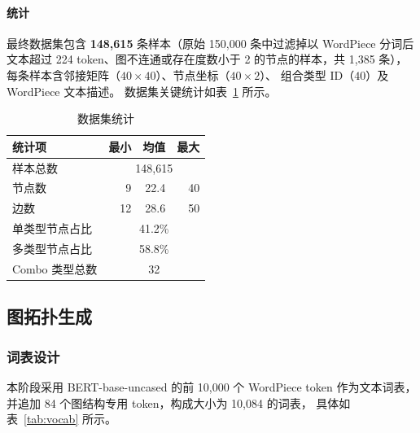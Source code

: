 \paragraph{统计}
最终数据集包含 \textbf{148,615} 条样本（原始 150,000 条中过滤掉以 WordPiece 分词后文本超过 224 token、图不连通或存在度数小于 2 的节点的样本，共 1,385 条），
每条样本含邻接矩阵（$40{\times}40$）、节点坐标（$40{\times}2$）、
组合类型 ID（$40$）及 WordPiece 文本描述。
数据集关键统计如表~\ref{tab:dataset_stats} 所示。

\begin{table}[h]
\centering
\caption{数据集统计}
\label{tab:dataset_stats}
\small
\begin{tabular}{lrrr}
\toprule
统计项 & 最小 & 均值 & 最大 \\
\midrule
样本总数           & \multicolumn{3}{c}{148,615} \\
节点数             & 9    & 22.4 & 40  \\
边数               & 12   & 28.6 & 50  \\
单类型节点占比     & \multicolumn{3}{c}{41.2\%} \\
多类型节点占比     & \multicolumn{3}{c}{58.8\%} \\
Combo 类型总数     & \multicolumn{3}{c}{32} \\
\bottomrule
\end{tabular}
\end{table}

\subsection{图拓扑生成}
\label{subsec:llm_graph}

\subsubsection{词表设计}

本阶段采用 BERT-base-uncased 的前 10,000 个 WordPiece token 作为文本词表，
并追加 84 个图结构专用 token，构成大小为 10,084 的词表，
具体如表~\ref{tab:vocab} 所示。

